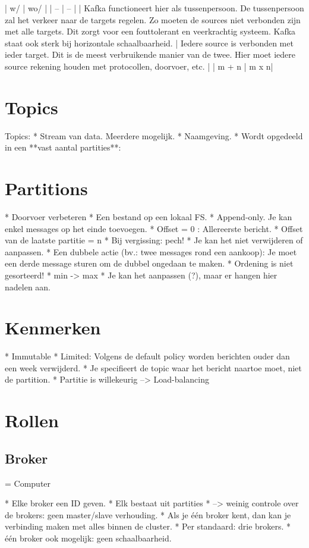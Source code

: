 \documentclass[a4paper,10pt,twoside]{report}
\begin{document}
| w/ | wo/ |
| -- | -- |
|  Kafka functioneert hier als tussenpersoon. De tussenpersoon zal het verkeer naar de targets regelen. Zo moeten de sources niet verbonden zijn met alle targets. Dit zorgt voor een fouttolerant en veerkrachtig systeem. Kafka staat ook sterk bij horizontale schaalbaarheid. | Iedere source is verbonden met ieder target. Dit is de meest verbruikende manier van de twee. Hier moet iedere source rekening houden met protocollen, doorvoer, etc. |
| m + n | m x n|


\section{Topics}
Topics:
* Stream van data. Meerdere mogelijk.
* Naamgeving.
* Wordt opgedeeld in een **vast aantal partities**:

\section{Partitions}
* Doorvoer verbeteren
* Een bestand op een lokaal FS.
* Append-only. Je kan enkel messages op het einde toevoegen.
* Offset = 0 : Allereerste bericht. 
* Offset van de laatste partitie = n
* Bij vergissing: pech!
*  Je kan het niet verwijderen of aanpassen.
*  Een dubbele actie (bv.: twee messages rond een aankoop): Je moet een derde message sturen om de dubbel ongedaan te maken.
* Ordening is niet gesorteerd!
* min -> max
* Je kan het aanpassen (?), maar er hangen hier nadelen aan.


\section{Kenmerken}
* Immutable
* Limited: Volgens de default policy worden berichten ouder dan een week verwijderd.
* Je specifieert de topic waar het bericht naartoe moet, niet de partition.
* Partitie is willekeurig --> Load-balancing

\section{Rollen}

\subsection{Broker}
= Computer

* Elke broker een ID geven.
* Elk bestaat uit partities 
* --> weinig controle over de brokers: geen master/slave verhouding.
* Als je één broker kent, dan kan je verbinding maken met alles binnen de cluster.
* Per standaard: drie brokers.
* één broker ook mogelijk: geen schaalbaarheid.
\end{document}
